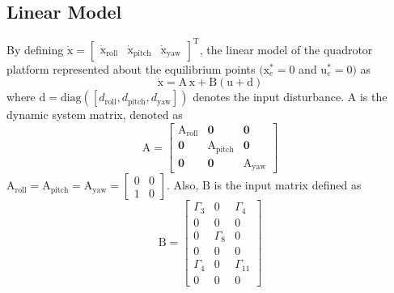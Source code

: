 \documentclass[3p]{elsarticle}
\begin{document}
\subsection{Linear Model}

\noindent By defining $\boldsymbol{\dot{\mathrm{x}}} = \begin{bmatrix}
    \boldsymbol{{\mathrm{\dot x_{\text{roll}}}}}&
    \boldsymbol{{\mathrm{\dot x_{\text{pitch}}}}}&
    \boldsymbol{{\mathrm{\dot x_{\text{yaw}}}}}
\end{bmatrix}^{\mathrm{T}}$, the linear model of the quadrotor platform represented about the equilibrium points $(\boldsymbol{{\mathrm{x}}}_e^*\!=\!0$ and $\boldsymbol{{\mathrm{u}}}_e^*\!=\!0)$ as
\begin{equation}\label{eq:linear}
    \boldsymbol{\dot{\mathrm{x}}} = \boldsymbol{\mathrm{A\,x}} + 
    \boldsymbol{\mathrm{B}}
    \left(\boldsymbol{\mathrm{u}} + \boldsymbol{\mathrm{d}}\right)
\end{equation}
where $\boldsymbol{\mathrm{d}} = \text{diag}([d_{\text{roll}}, d_{\text{pitch}}, d_{\text{yaw}}])$ denotes the input disturbance.
$\boldsymbol{\mathrm{A}}$ is the dynamic system matrix, denoted as
\begin{equation}
    \boldsymbol{\mathrm{A}} = \begin{bmatrix}
        \boldsymbol{{\mathrm{A_{\text{roll}}}}} & \boldsymbol{0} & \boldsymbol{0}\\
        \boldsymbol{0} & \boldsymbol{{\mathrm{A_{\text{pitch}}}}} & \boldsymbol{0} \\
        \boldsymbol{0} & \boldsymbol{0} & \boldsymbol{{\mathrm{A_{\text{yaw}}}}}
    \end{bmatrix}
\end{equation}
$
        \boldsymbol{\mathrm{A}}_{\text{roll}}  =\boldsymbol{\mathrm{A}}_{\text{pitch}}  = \boldsymbol{\mathrm{A}}_{\text{yaw}}  = \begin{bmatrix}
            0 & 0\\
            1 & 0
        \end{bmatrix}
$. Also, $\boldsymbol{\mathrm{B}}$ is the input matrix defined as
\begin{equation}
    \boldsymbol{\mathrm{B}} = 
     \begin{bmatrix}
        \Gamma_3 & 0 & \Gamma_4\\
        0 & 0 & 0 \\
        0 & \Gamma_8 & 0 \\
        0 & 0 & 0 \\
        \Gamma_4 & 0 & \Gamma_{11} \\
        0 & 0 & 0
    \end{bmatrix}
\end{equation}
\end{document}
